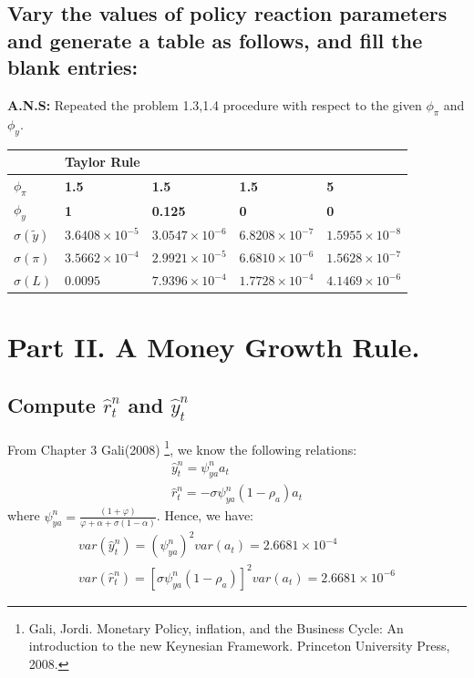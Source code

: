 \documentclass[12pt]{article}
\begin{document}
\subsection{Vary the values of policy reaction parameters and generate a table as follows, and fill the blank entries:}
\textbf{A.N.S:} Repeated the problem 1.3,1.4 procedure with respect to the given $\phi_{\pi}$ and  $\phi_{y}$. 
{\centering
\begin{table}[h]
\centering
\begin{tabular}{lllll}
\hline
 & \multicolumn{4}{l}{Taylor Rule} \\ \hline
$\phi_{\pi}$ &    \textbf{1.5}    &  \textbf{1.5}      & \textbf{1.5}      &  \textbf{5}     \\
 $\phi_{y}$&    \textbf{1 }   &   \textbf{0.125}     &   \textbf{0}    & \textbf{ 0}     \\
 $\sigma(\tilde{y})$&   $3.6408 \times 10^{-5}$   &  $3.0547\times 10^{-6}$      &  $6.8208\times 10^{-7}$     & $1.5955\times 10^{-8}$      \\ 
 $\sigma(\pi)$&   $3.5662 \times 10^{-4}$    &  $2.9921  \times 10^{-5}$      &  $6.6810\times 10^{-6} $  & $1.5628\times 10^{-7}$       \\ 
  $\sigma(L)$&   $0.0095$  &     $7.9396 \times 10^{-4}$    &   $1.7728\times 10^{-4}$     &  $4.1469\times 10^{-6}$    \\   \hline
\end{tabular}
\end{table}}
\newpage
\section{Part II.  A Money Growth Rule.}  %
\subsection{Compute $\hat{r}_t^n$ and  $\hat{y}_t^n$ }
From Chapter 3 Gali(2008) \footnote{Gali, Jordi. Monetary Policy, inflation, and the Business Cycle: An introduction to the new Keynesian Framework. Princeton University Press, 2008.}, we know the following relations:
\begin{gather}
 \hat{y}_t^n = \psi_{ya}^n a_t\\
 \hat{r}_t^n = -\sigma\psi_{ya}^n(1-\rho_{a})a_t
\end{gather}
where $\psi_{ya}^n =\frac{(1+\varphi)}{\varphi+\alpha+\sigma(1-\alpha)} $.
Hence, we have:
\begin{gather}
  var(\hat{y}_t^n) =  (\psi_{ya}^n)^2 var(a_t) =  2.6681\times 10^{-4}\\
  var(\hat{r}_t^n) = [\sigma\psi_{ya}^n(1-\rho_{a})]^2  var(a_t) = 2.6681\times 10^{-6}
\end{gather}
\end{document}
